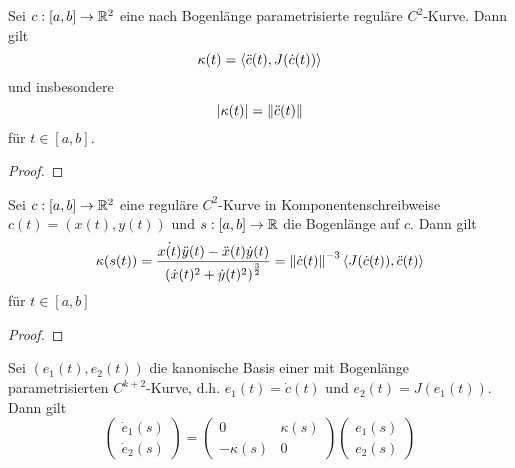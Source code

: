 \documentclass[
pdftex,
oneside,
headsepline,
11pt, 
]{scrreprt}
\begin{document}
\begin{lem}
	Sei $c:[a,b]\to \mathbb{R}^2$ eine nach Bogenlänge parametrisierte reguläre $C^2$-Kurve. Dann gilt
	\[ \kappa(t)=\left\langle \ddot{c}(t),J(\dot{c}(t)) \right\rangle \] und insbesondere 
	\[|\kappa(t)|=\left\lVert\ddot{c}(t)\right\rVert\] für $t\in[a,b]$.
\end{lem}
\begin{proof}
	
\end{proof}
\begin{lem}
Sei $c:[a,b]\to \mathbb{R}^2$ eine reguläre $C^2$-Kurve in Komponentenschreibweise $c(t)=(x(t),y(t))$ und $s:[a,b]\to\mathbb{R}$ die Bogenlänge auf $c$. Dann gilt
\[\kappa(s(t))=\frac{\dot{x(t)}\ddot{y}(t)-\ddot{x}(t)\dot{y}(t)}{\left( \dot{x}(t)^2+\dot{y}(t)^2  \right)^{\frac{3}{2}}}=\left\lVert\dot{c}(t)\right\rVert^{-3}\left\langle J(\dot{c}(t)),\ddot{c}(t) \right\rangle\] für $t\in[a,b]$
\end{lem}
\begin{proof}
	
\end{proof}
\begin{bsp}
	
\end{bsp}
\begin{de}[Ordnung]
	
\end{de}
\begin{de}[Krümmungskreis]
	
\end{de}
\begin{lem}
	
\end{lem}
\begin{de}[Evolute]
	
\end{de}
\begin{lem}
	Sei $(e_1(t),e_2(t))$ die kanonische Basis einer mit Bogenlänge parametrisierten $C^{k+2}$-Kurve, d.h. $e_1(t)=\dot{c}(t)$ und $e_2(t)=J(e_1(t))$. Dann gilt \[  \begin{pmatrix}
	\dot{e}_1(s)\\
	\dot{e}_2(s)
	\end{pmatrix}=\begin{pmatrix}
	0 & \kappa(s)\\
	-\kappa(s) & 0
	\end{pmatrix} \begin{pmatrix}
	e_1(s)\\
	e_2(s)
	\end{pmatrix} \]
\end{lem}
\end{document}
